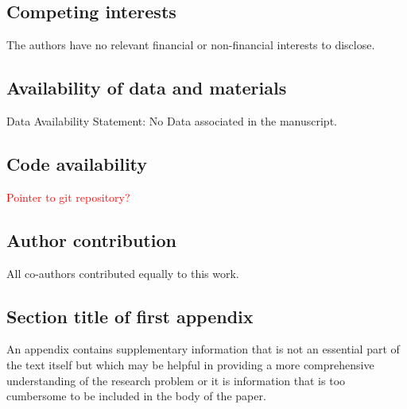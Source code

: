 \documentclass[sn-mathphys-num,a4paper,iicol,lineno,pdflatex]{sn-jnl-hacked}
\theoremstyle{thmstyleone}%
\theoremstyle{thmstyletwo}%
\theoremstyle{thmstylethree}%
\begin{document}
\subsection*{Competing interests}
The authors have no relevant financial or non-financial interests to disclose.

\subsection*{Availability of data and materials}
Data Availability Statement: No Data associated in the manuscript.

\subsection*{Code availability}

\textcolor{red}{Pointer to git repository?}

\subsection*{Author contribution}

All co-authors contributed equally to this work.

\begin{appendices}

\section{Section title of first appendix}

An appendix contains supplementary information that is not an essential part of the text itself but which may be helpful in providing a more comprehensive understanding of the research problem or it is information that is too cumbersome to be included in the body of the paper.

\end{appendices}



\end{document}
